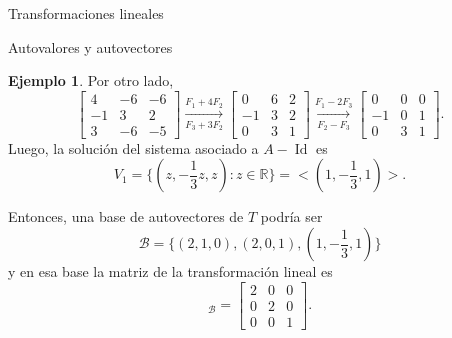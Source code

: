 \documentclass[a4paper,12pt,twoside,spanish,reqno]{amsbook}
\theoremstyle{definition}
\newtheorem{ejemplo}{Ejemplo}[section]
\theoremstyle{remark}
\newcommand{\Id}{\operatorname{Id}}
\newcommand{\R}{\mathbb R}
\begin{document}
\begin{chapter}{Transformaciones lineales}
\begin{section}{Autovalores y autovectores}
\begin{ejemplo}
			Por otro lado, 
			\begin{equation*}
			\begin{bmatrix}4 &-6 &-6\\ -1& 3& 2\\3 &-6& -5 	\end{bmatrix}
			\underset{F_3+3F_2}{\stackrel{F_1+4 F_2}{\longrightarrow}} 
			\begin{bmatrix}0 &6 &2\\ -1& 3& 2\\0 &3& 1 	\end{bmatrix}
			\underset{F_2-F_3}{\stackrel{F_1-2 F_3}{\longrightarrow}}
			\begin{bmatrix}0 &0 &0\\ -1& 0& 1\\0 &3& 1 	\end{bmatrix}.
			\end{equation*}
			Luego,  la solución del sistema asociado a  $A-\Id$ es 
			$$
			V_1 = \{(z,-\frac13z,z): z \in \R\} = <(1,-\frac13,1)>.
			$$
			
			Entonces, una base de autovectores de $T$ podría ser
			$$
			\mathcal{B} = \{(2,1,0),(2,0,1),(1,-\frac13,1) \}
			$$
			y en esa base la matriz de la transformación lineal es
			\begin{equation*}
			[T]_{\mathcal{B}} = \begin{bmatrix}2 &0 &0\\ 0& 2& 0\\0 &0& 1 	\end{bmatrix}.
			\end{equation*}
		\end{ejemplo}
	
		
		\end{section}
	
	
		
	
		
	\end{chapter}
\end{document}
